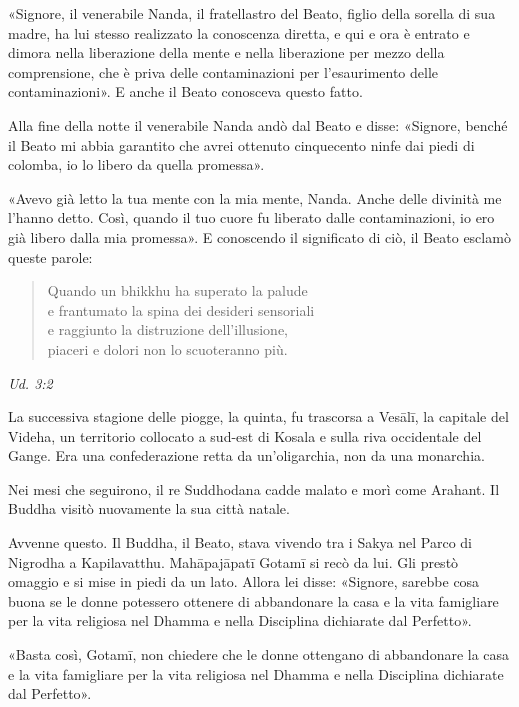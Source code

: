 «Signore, il venerabile Nanda, il fratellastro del Beato, figlio della
sorella di sua madre, ha lui stesso realizzato la conoscenza diretta, e
qui e ora è entrato e dimora nella liberazione della mente e nella
liberazione per mezzo della comprensione, che è priva delle
contaminazioni per l’esaurimento delle contaminazioni». E anche il Beato
conosceva questo fatto.


Alla fine della notte il venerabile Nanda andò dal Beato e disse:
«Signore, benché il Beato mi abbia garantito che avrei ottenuto
cinquecento ninfe dai piedi di colomba, io lo libero da quella
promessa».


«Avevo già letto la tua mente con la mia mente, Nanda. Anche delle
divinità me l’hanno detto. Così, quando il tuo cuore fu liberato dalle
contaminazioni, io ero già libero dalla mia promessa». E conoscendo il
significato di ciò, il Beato esclamò queste parole:


\begin{quote}
Quando un bhikkhu ha superato la palude \\
e frantumato la spina dei desideri sensoriali \\
e raggiunto la distruzione dell’illusione, \\
piaceri e dolori non lo scuoteranno più.
\end{quote}

\emph{Ud. 3:2}


 La successiva stagione delle piogge, la quinta, fu
trascorsa a Vesālī, la capitale del Videha, un territorio collocato a
sud-est di Kosala e sulla riva occidentale del Gange. Era una
confederazione retta da un’oligarchia, non da una monarchia.


 Nei mesi che seguirono, il re Suddhodana cadde malato
e morì come Arahant. Il Buddha visitò nuovamente la sua città natale.


 Avvenne questo. Il Buddha, il Beato, stava vivendo tra i
Sakya nel Parco di Nigrodha a Kapilavatthu. Mahāpajāpatī Gotamī si recò
da lui. Gli prestò omaggio e si mise in piedi da un lato. Allora lei
disse: «Signore, sarebbe cosa buona se le donne potessero ottenere di
abbandonare la casa e la vita famigliare per la vita religiosa nel
Dhamma e nella Disciplina dichiarate dal Perfetto».


«Basta così, Gotamī, non chiedere che le donne ottengano di abbandonare
la casa e la vita famigliare per la vita religiosa nel Dhamma e nella
Disciplina dichiarate dal Perfetto».


